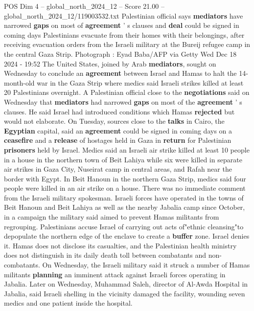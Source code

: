 \begin{textsample}{POS Dim 4 – global\_north\_2024\_12 – Score 21.00 – global\_north\_2024\_12/119003532.txt}  \label{ex:f4_pos_309}
Palestinian official says \textbf{mediators} have narrowed \textbf{gaps} on most of \textbf{agreement} ' s clauses and \textbf{deal} could be signed in coming days Palestinians evacuate from their homes with their belongings, after receiving evacuation orders from the Israeli military at the Bureij refugee camp in the central Gaza Strip.
Photograph : Eyad Baba/AFP via Getty Wed Dec 18 2024 - 19:52 The United States, joined by Arab \textbf{mediators}, sought on Wednesday to conclude an \textbf{agreement} between Israel and Hamas to halt the 14-month-old war in the Gaza Strip where medics said Israeli strikes killed at least 20 Palestinians overnight.
A Palestinian official close to the \textbf{negotiations} said on Wednesday that \textbf{mediators} had narrowed \textbf{gaps} on most of the \textbf{agreement} ' s clauses.
He said Israel had introduced conditions which Hamas \textbf{rejected} but would not elaborate.
On Tuesday, sources close to the \textbf{talks} in Cairo, the \textbf{Egyptian} capital, said an \textbf{agreement} could be signed in coming days on a \textbf{ceasefire} and a \textbf{release} of hostages held in Gaza in \textbf{return} for Palestinian \textbf{prisoners} held by Israel.
Medics said an Israeli air strike killed at least 10 people in a house in the northern town of Beit Lahiya while six were killed in separate air strikes in Gaza City, Nuseirat camp in central areas, and Rafah near the border with Egypt.
In Beit Hanoun in the northern Gaza Strip, medics said four people were killed in an air strike on a house.
There was no immediate comment from the Israeli military spokesman.
Israeli forces have operated in the towns of Beit Hanoun and Beit Lahiya as well as the nearby Jabalia camp since October, in a campaign the military said aimed to prevent Hamas militants from regrouping.
Palestinians accuse Israel of carrying out acts of"ethnic cleansing"to depopulate the northern edge of the enclave to create a \textbf{buffer} zone.
Israel denies it.
Hamas does not disclose its casualties, and the Palestinian health ministry does not distinguish in its daily death toll between combatants and non-combatants.
On Wednesday, the Israeli military said it struck a number of Hamas militants \textbf{planning} an imminent attack against Israeli forces operating in Jabalia.
Later on Wednesday, Muhammad Saleh, director of Al-Awda Hospital in Jabalia, said Israeli shelling in the vicinity damaged the facility, wounding seven medics and one patient inside the hospital.

\end{textsample}
